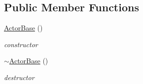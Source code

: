 \subsection*{Public Member Functions}
\begin{DoxyCompactItemize}
\item 
\hypertarget{classContent_1_1Actor_1_1Renderer_1_1ActorBase_a9035203c1532074a493b277c1fe824bc}{
\hyperlink{classContent_1_1Actor_1_1Renderer_1_1ActorBase_a9035203c1532074a493b277c1fe824bc}{ActorBase} ()}
\label{classContent_1_1Actor_1_1Renderer_1_1ActorBase_a9035203c1532074a493b277c1fe824bc}

\begin{DoxyCompactList}\small\item\em constructor \item\end{DoxyCompactList}\item 
\hypertarget{classContent_1_1Actor_1_1Renderer_1_1ActorBase_a7353f69aa580efecbafbc5c45a5e48a3}{
\hyperlink{classContent_1_1Actor_1_1Renderer_1_1ActorBase_a7353f69aa580efecbafbc5c45a5e48a3}{$\sim$ActorBase} ()}
\label{classContent_1_1Actor_1_1Renderer_1_1ActorBase_a7353f69aa580efecbafbc5c45a5e48a3}

\begin{DoxyCompactList}\small\item\em destructor \item\end{DoxyCompactList}\end{DoxyCompactItemize}
